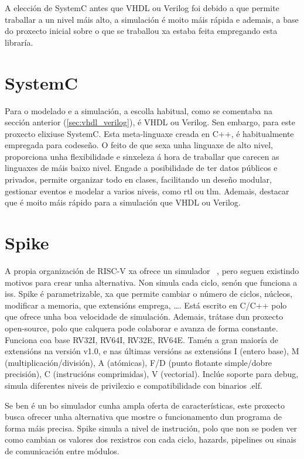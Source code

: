 A elección de SystemC antes que VHDL ou Verilog foi debido a que permite traballar a un nivel máis alto, a simulación é moito máis rápida e ademais, a base do proxecto inicial sobre o que se traballou xa estaba feita empregando esta libraría.

\section{SystemC}\label{sec:systemc}
Para o modelado e a simulación, a escolla habitual, como se comentaba na sección anterior (\ref{sec:vhdl_verilog}), é VHDL ou Verilog. Sen embargo, para este proxecto elixiuse SystemC. Esta \gls{meta-linguaxe} creada en C++, é habitualmente empregada para codeseño. O feito de que sexa unha linguaxe de alto nivel, proporciona unha flexibilidade e sinxeleza á hora de traballar que carecen as linguaxes de máis baixo nivel. Engade a posibilidade de ter datos públicos e privados, permite organizar todo en clases, facilitando un deseño modular, gestionar eventos e modelar a varios niveis, como \acrfull{rtl} ou \acrfull{tlm}. Ademais, destacar que é moito máis rápido para a simulación que VHDL ou Verilog.

\section{Spike}\label{sec:spike}
A propia organización de RISC-V xa ofrece un simulador ~\cite{sim_spike}, pero seguen existindo motivos para crear unha alternativa. Non simula cada ciclo, senón que funciona a \acrfull{iss}. Spike é parametrizable, xa que permite cambiar o número de ciclos, núcleos, modificar a memoria, que extensións emprega, \dots. Está escrito en C/C++ polo que ofrece unha boa velocidade de simulación. Ademais, trátase dun proxecto open-source, polo que calquera pode colaborar e  avanza de forma constante. Funciona coa base RV32I, RV64I, RV32E, RV64E. Tamén a gran maioría de extensións na versión v1.0, e nas últimas versións as extensións I (entero base), M (multiplicación/división), A (atómicas), F/D (punto flotante simple/dobre precisión), C (instrucións comprimidas), V (vectorial). Inclúe soporte para debug, simula diferentes niveis de privilexio e compatibilidade con binarios .elf. 

Se ben é un bo simulador cunha ampla oferta de características, este proxecto busca ofrecer unha alternativa que mostre o funcionamento dun programa de forma máis precisa. Spike simula a nivel de instrución, polo que non se poden ver como cambian os valores dos rexistros con cada ciclo, hazards, pipelines ou sinais de comunicación entre módulos.

